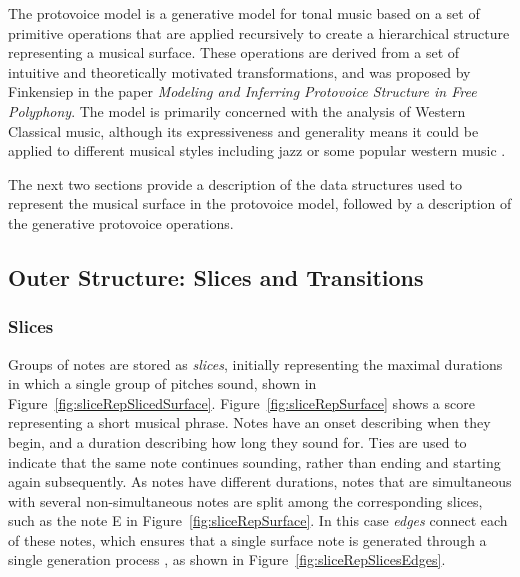 \documentclass[12pt,a4paper,twoside,openany]{report} \usepackage[pdfborder={0 0 0}]{hyperref}    %
\theoremstyle{definition} \newtheorem{definition}{Definition}[section]
\begin{document}
The protovoice model is a generative model for tonal music based on a set of primitive operations that are applied
recursively to create a hierarchical structure representing a musical surface. 
These operations are derived from a set of intuitive and theoretically motivated transformations, and was proposed by Finkensiep in the paper 
\textit{Modeling and Inferring Protovoice Structure in Free Polyphony}\cite{finkensiepModelingInferringProtovoice2021}.
The model is primarily concerned with the analysis of Western Classical music, although its expressiveness and generality means it could be applied to different musical styles including jazz or some popular western music \cite{finkensiepStructureFreePolyphony2023}. 


The next two sections provide a description of the data structures used to represent the musical surface in the protovoice model, followed by a description of the generative protovoice operations. 

\subsection{Outer Structure: Slices and Transitions} 
\label{sub:slicesTransitions}

\subsubsection{Slices}
\label{sub:slicesPV}

Groups of notes are stored as \textit{slices}, initially representing the maximal durations in which a single group of pitches sound, shown in Figure~\ref{fig:sliceRepSlicedSurface}.
Figure~\ref{fig:sliceRepSurface} shows a score representing a short musical phrase. 
Notes have an onset describing when they begin, and a duration describing how long they sound for. 
Ties are used to indicate that the same note continues sounding, rather than ending and starting again subsequently. 
As notes have different durations, notes that are simultaneous with several non-simultaneous notes are split among the corresponding slices, such as the note E in Figure~\ref{fig:sliceRepSurface}.
In this case \textit{edges} connect each of these notes, which ensures that a single surface note is generated through a single generation process \cite{finkensiepModelingInferringProtovoice2021}, as shown in Figure~\ref{fig:sliceRepSlicesEdges}. 

\end{document}
